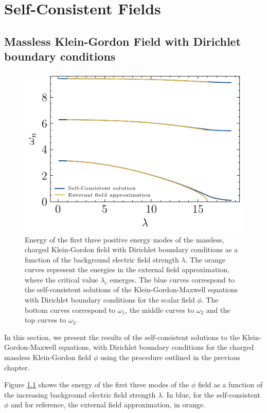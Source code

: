 \chapter{Self-Consistent Fields}
\section{Massless Klein-Gordon Field with Dirichlet boundary conditions}

\begin{figure} \centering \includegraphics[width=0.8\linewidth]{figures/dirichlet/eigenvaluesHadamardDirichlet.pdf} \caption{Energy of the first three positive energy modes of the massless, charged Klein-Gordon field with Dirichlet boundary conditions as a function of the background electric field strength $\lambda$. The orange curves represent the energies in the external field approximation, where the critical value $\lambda_c$ emerges. The blue curves correspond to the self-consistent solutions of the Klein-Gordon-Maxwell equations with Dirichlet boundary conditions for the scalar field $\phi$.  The bottom curves correspond to $\omega_1$, the middle curves to $\omega_2$ and the top curves to $\omega_3$.} \label{fig:eigenvaluesHadamardDirichlet} \end{figure}

In this section, we present the results of the self-consistent solutions to the Klein-Gordon-Maxwell equations, with Dirichlet boundary conditions for the charged massless Klein-Gordon field $\phi$ using the procedure outlined in the previous chapter.

Figure \ref{fig:eigenvaluesHadamardDirichlet} shows the energy of the first three modes of the $\phi$  field as a function of the increasing background electric field strength $\lambda$. In blue, for the self-consistent $\phi$  and for reference, the external field approximation, in orange.

